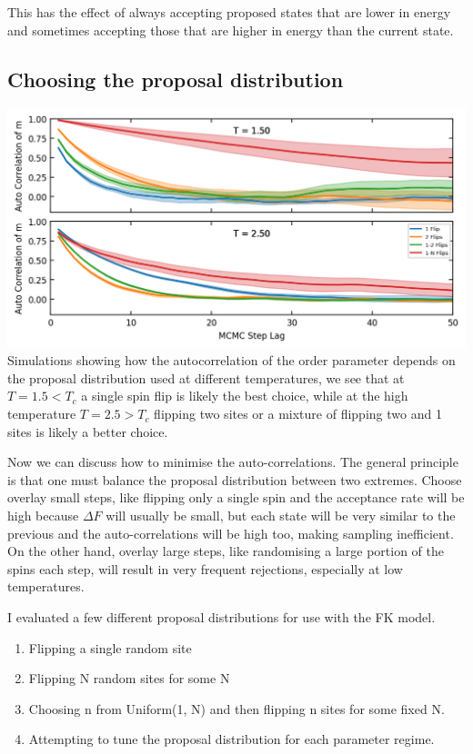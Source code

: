 This has the effect of always accepting proposed states that are lower in energy and sometimes accepting those that are higher in energy than the current state.

\hypertarget{choosing-the-proposal-distribution}{%
\subsection{Choosing the proposal distribution}\label{choosing-the-proposal-distribution}}

\includegraphics{figs/lsr/autocorr_multiple_proposals.png} Simulations showing how the autocorrelation of the order parameter depends on the proposal distribution used at different temperatures, we see that at \(T = 1.5 < T_c\) a single spin flip is likely the best choice, while at the high temperature \(T = 2.5 > T_c\) flipping two sites or a mixture of flipping two and 1 sites is likely a better choice.

Now we can discuss how to minimise the auto-correlations. The general principle is that one must balance the proposal distribution between two extremes. Choose overlay small steps, like flipping only a single spin and the acceptance rate will be high because \(\Delta F\) will usually be small, but each state will be very similar to the previous and the auto-correlations will be high too, making sampling inefficient. On the other hand, overlay large steps, like randomising a large portion of the spins each step, will result in very frequent rejections, especially at low temperatures.

I evaluated a few different proposal distributions for use with the FK model.

\begin{enumerate}
\def\labelenumi{\arabic{enumi}.}
\item
  Flipping a single random site
\item
  Flipping N random sites for some N
\item
  Choosing n from Uniform(1, N) and then flipping n sites for some fixed N.
\item
  Attempting to tune the proposal distribution for each parameter regime.
\end{enumerate}

